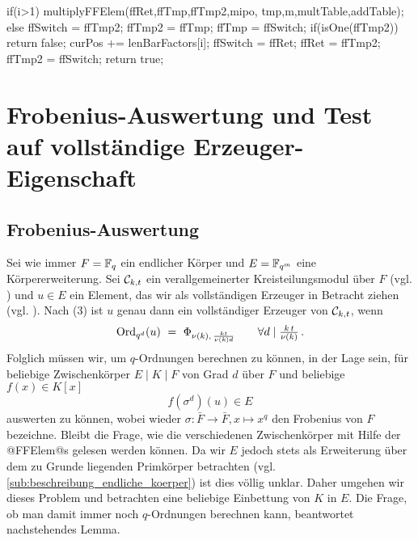 \begin{ccode}[caption={Aus \url{../Sage/enumeratePCNs.c}},
  firstnumber=666, label=lst:isPrimitive]
{{        if(i>1){
            multiplyFFElem(ffRet,ffTmp,ffTmp2,mipo,
                    tmp,m,multTable,addTable);
        }else{
            ffSwitch = ffTmp2; ffTmp2 = ffTmp; ffTmp = ffSwitch;
        }
        if(isOne(ffTmp2)) return false;
        curPos += lenBarFactors[i];
        ffSwitch = ffRet; ffRet = ffTmp2; ffTmp2 = ffSwitch;
    }
    return true;
}
\end{ccode}

\section{Frobenius-Auswertung und Test auf vollständige
  Erzeuger-Eigenschaft}

\subsection{Frobenius-Auswertung}

Sei wie immer $F = \mathbb{F}_q$ ein endlicher Körper und $E = \mathbb{F}_{q^m}$ eine
Körpererweiterung. Sei $\mathcal{C}_{k,t}$ ein verallgemeinerter
Kreisteilungsmodul über $F$ (vgl.
) und 
$u\in E$ ein Element, das wir als vollständigen Erzeuger 
in Betracht ziehen (vgl. ). Nach 
 (3) ist $u$ genau dann ein vollständiger 
Erzeuger von $\mathcal{C}_{k,t}$, wenn
\[ \operatorname{Ord}_{q^d}(u) \ =\  \Phi_{\nu(k),\, \frac{kt}{\nu(k)d}} \qquad
  \forall d \mid \tfrac{k\,t}{\nu(k)}\,.\]
Folglich müssen wir, um $q$-Ordnungen berechnen zu können, in der Lage sein,
für beliebige Zwischenkörper $E\mid K\mid F$ von Grad $d$ über $F$ und beliebige 
$f(x) \in K[x]$ 
\[ f(\sigma^d)(u) \in E\]
auswerten zu können, wobei wieder $\sigma: \bar F\to \bar F, x \mapsto x^q$ den
Frobenius von $F$ bezeichne. Bleibt die Frage, wie die verschiedenen
Zwischenkörper mit Hilfe der @FFElem@s gelesen werden können. Da wir $E$ jedoch
stets als Erweiterung über dem zu Grunde liegenden Primkörper betrachten 
(vgl. \autoref{sub:beschreibung_endliche_koerper}) ist dies völlig unklar.
Daher umgehen wir dieses Problem und betrachten eine beliebige Einbettung von
$K$ in $E$. Die Frage, ob man damit immer noch $q$-Ordnungen berechnen kann,
beantwortet nachstehendes Lemma.

